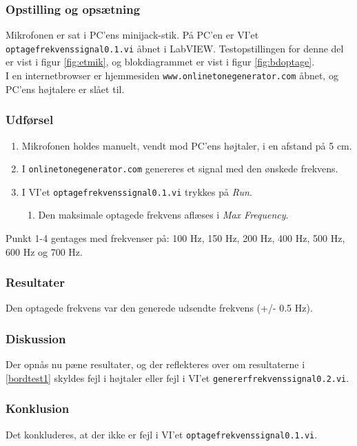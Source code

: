 		\subsubsection{Opstilling og opsætning}
		Mikrofonen er sat i PC'ens minijack-stik. På PC'en er VI'et \texttt{optagefrekvenssignal0.1.vi} åbnet i LabVIEW. Testopstillingen for denne del er vist i figur \ref{fig:etmik}, og blokdiagrammet er vist i figur \ref{fig:bdoptage}.\\ 
		I en internetbrowser er hjemmesiden \texttt{www.onlinetonegenerator.com} åbnet, og PC'ens højtalere er slået til. 
		
		\subsubsection{Udførsel}
			\begin{enumerate}
				\item Mikrofonen holdes manuelt, vendt mod PC'ens højtaler, i en afstand på 5 cm. 
				\item I \texttt{onlinetonegenerator.com} genereres et signal med den ønskede frekvens. 
				\item I VI'et \texttt{optagefrekvenssignal0.1.vi} trykkes på \textit{Run}. 
					\begin{enumerate}
						\item Den maksimale optagede frekvens aflæses i \textit{Max Frequency}. 
					\end{enumerate}	  
			\end{enumerate}
			
			Punkt 1-4 gentages med frekvenser på: 100 Hz, 150 Hz, 200 Hz, 400 Hz, 500 Hz, 600 Hz og 700 Hz. 
			
			\subsubsection{Resultater}
			Den optagede frekvens var den generede udsendte frekvens (+/- 0.5 Hz). 
			\subsubsection{Diskussion}
			Der opnås nu pæne resultater, og der reflekteres over om resultaterne i \ref{bordtest1} skyldes fejl i højtaler eller fejl i VI'et \texttt{genererfrekvenssignal0.2.vi}. 
			\subsubsection{Konklusion}
			Det konkluderes, at der ikke er fejl i VI'et \texttt{optagefrekvenssignal0.1.vi}. 
